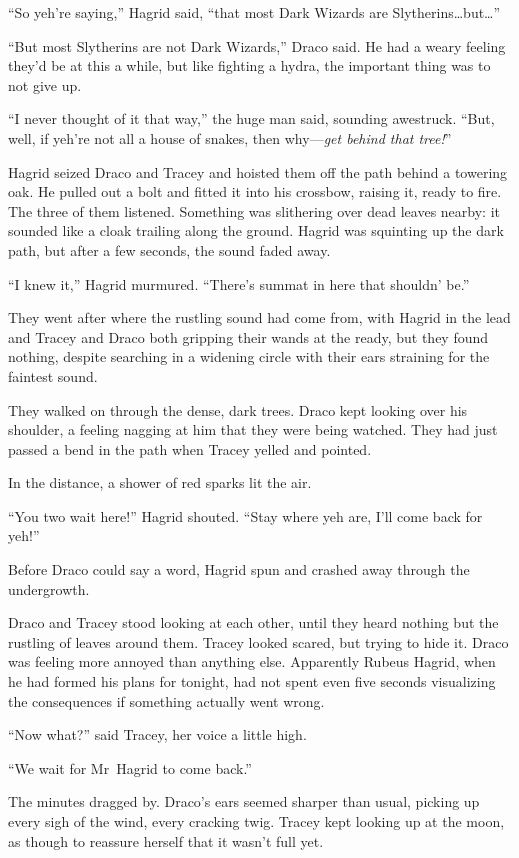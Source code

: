 “So yeh’re saying,” Hagrid said, “that most Dark Wizards are Slytherins…but…”

“But most Slytherins are not Dark Wizards,” Draco said. He had a weary feeling they’d be at this a while, but like fighting a hydra, the important thing was to not give up.

“I never thought of it that way,” the huge man said, sounding awestruck. “But, well, if yeh’re not all a house of snakes, then why—\emph{get behind that tree!}”

Hagrid seized Draco and Tracey and hoisted them off the path behind a towering oak. He pulled out a bolt and fitted it into his crossbow, raising it, ready to fire. The three of them listened. Something was slithering over dead leaves nearby: it sounded like a cloak trailing along the ground. Hagrid was squinting up the dark path, but after a few seconds, the sound faded away.

“I knew it,” Hagrid murmured. “There’s summat in here that shouldn’ be.”

They went after where the rustling sound had come from, with Hagrid in the lead and Tracey and Draco both gripping their wands at the ready, but they found nothing, despite searching in a widening circle with their ears straining for the faintest sound.

They walked on through the dense, dark trees. Draco kept looking over his shoulder, a feeling nagging at him that they were being watched. They had just passed a bend in the path when Tracey yelled and pointed.

In the distance, a shower of red sparks lit the air.

“You two wait here!” Hagrid shouted. “Stay where yeh are, I’ll come back for yeh!”

Before Draco could say a word, Hagrid spun and crashed away through the undergrowth.

Draco and Tracey stood looking at each other, until they heard nothing but the rustling of leaves around them. Tracey looked scared, but trying to hide it. Draco was feeling more annoyed than anything else. Apparently Rubeus Hagrid, when he had formed his plans for tonight, had not spent even five seconds visualizing the consequences if something actually went wrong.

“Now what?” said Tracey, her voice a little high.

“We wait for Mr~Hagrid to come back.”

The minutes dragged by. Draco’s ears seemed sharper than usual, picking up every sigh of the wind, every cracking twig. Tracey kept looking up at the moon, as though to reassure herself that it wasn’t full yet.

